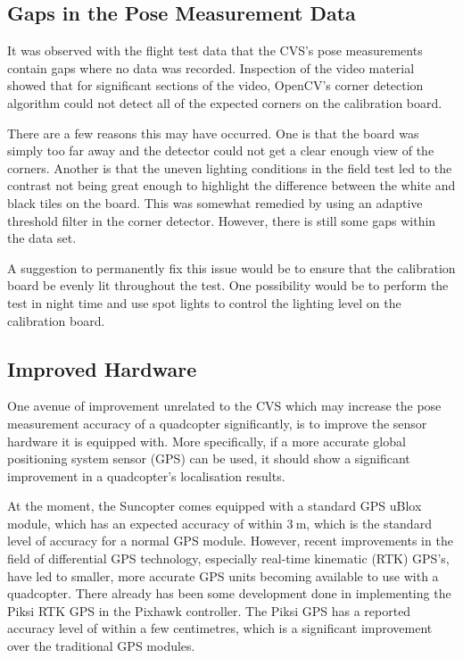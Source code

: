 \subsection{Gaps in the Pose Measurement Data}

It was observed with the flight test data that the CVS's pose measurements contain gaps where no data was recorded. Inspection of the video material showed that for significant sections of the video, OpenCV's corner detection algorithm could not detect all of the expected corners on the calibration board. 

There are a few reasons this may have occurred. One is that the board was simply too far away and the detector could not get a clear enough view of the corners. Another is that the uneven lighting conditions in the field test led to the contrast not being great enough to highlight the difference between the white and black tiles on the board. This was somewhat remedied by using an adaptive threshold filter in the corner detector. However, there is still some gaps within the data set. 

A suggestion to permanently fix this issue would be to ensure that the calibration board be evenly lit throughout the test. One possibility would be to perform the test in night time and use spot lights to control the lighting level on the calibration board. 

\subsection{Improved Hardware}

One avenue of improvement unrelated to the CVS which may increase the pose measurement accuracy of a quadcopter significantly, is to improve the sensor hardware it is equipped with. More specifically, if a more accurate global positioning system sensor (GPS) can be used, it should show a significant improvement in a quadcopter's localisation results. 

At the moment, the Suncopter comes equipped with a standard GPS uBlox module, which has an expected accuracy of within $\SI{3}{\m}$, which is the standard level of accuracy for a normal GPS module. However, recent improvements in the field of differential GPS technology, especially real-time kinematic (RTK) GPS's, have led to smaller, more accurate GPS units becoming available to use with a quadcopter. There already has been some development done in implementing the Piksi RTK GPS in the Pixhawk controller. The Piksi GPS has a reported accuracy level of within a few centimetres, which is a significant improvement over the traditional GPS modules. 

